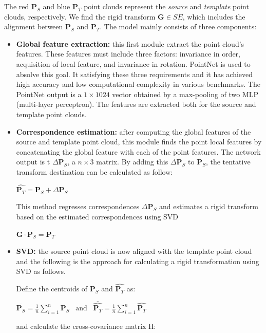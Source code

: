 The red $\boldsymbol{P}_S$ and blue $\boldsymbol{P}_T$ point clouds
represent the \emph{source} and \emph{template} point clouds,
respectively. We find the rigid transform $\boldsymbol{G} \in SE$,
which includes the alignment between $\boldsymbol{P}_S$ and
$\boldsymbol{P}_T$. The model mainly consists of three components:

\begin{itemize}
\item
  \textbf{Global feature extraction:} this first module extract the
  point cloud's features. These features must include three factors:
  invariance in order, acquisition of local feature, and invariance in
  rotation. PointNet is used to absolve this goal. It satisfying these
  three requirements and it has achieved high accuracy and low
  computational complexity in various benchmarks. The PointNet output is
  a $1 \times 1024$ vector obtained by a max-pooling of two MLP (multi-layer
  perceptron). The features are extracted both for the source and
  template point clouds.
\item
  \textbf{Correspondence estimation:} after computing the global
  features of the source and template point cloud, this module finds the
  point local features by concatenating the global feature with each of
  the point features. The network output is t
  $\Delta\boldsymbol{P}_S$, a $n \times 3$ matrix. By adding this
  $\Delta\boldsymbol{P}_S$ to $\boldsymbol{P}_S$, the tentative
  transform destination can be calculated as follow:

  $ \hat{\boldsymbol {P}_T} = \boldsymbol {P}_S + \Delta \boldsymbol {P}_S $

  This method regresses correspondences $\Delta\boldsymbol{P}_S$ and
  estimates a rigid transform based on the estimated correspondences
  using SVD

  $ \boldsymbol {G}\cdot \boldsymbol {P}_S= \boldsymbol {P}_T$
\item
  \textbf{SVD:} the source point cloud is now aligned with the template
  point cloud and the following is the approach for calculating a rigid
  transformation using SVD as follows.

  Define the centroids of $\boldsymbol{P}_S$ and
  $\hat{\boldsymbol{P}_T}$ as:

  $\overline{\boldsymbol {P}_S} = \frac{1}{n}\sum ^{n}_{i=1}\boldsymbol {P}_S \;\;\; \text{and} \;\;\; \overline{\hat{\boldsymbol {P}_T}} = \frac{1}{n}\sum ^{n}_{i=1}\hat{\boldsymbol {P}_T}$

  and calculate the cross-covariance matrix H:


\end{itemize}
